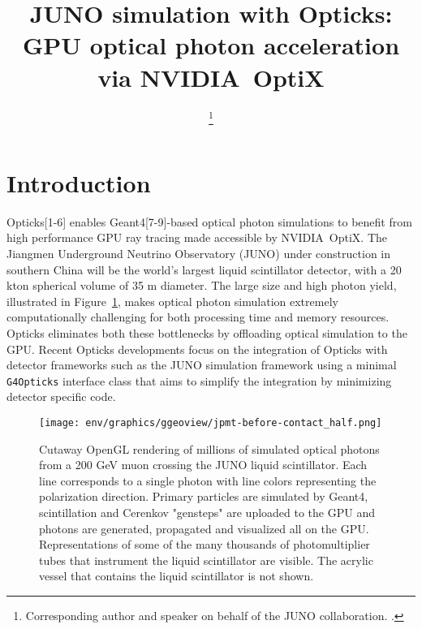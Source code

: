 \documentclass{webofc}
\begin{document}
%
\title{JUNO simulation with Opticks: GPU optical photon acceleration via NVIDIA\textregistered\ OptiX\texttrademark}

\author{ \fnsep\thanks{Corresponding author and speaker on behalf of the JUNO collaboration. .}}



\abstract{%

}
%
\maketitle
%
%
\section{Introduction}%
\label{intro}
%
Opticks[1-6] enables Geant4[7-9]-based optical photon simulations 
to benefit from high performance GPU ray tracing made accessible 
by NVIDIA\textregistered\ OptiX\texttrademark[10-12].
%
The Jiangmen Underground Neutrino Observatory (JUNO)\cite{juno} 
under construction in southern China will be the world's largest liquid scintillator detector, 
with a 20 kton spherical volume of 35 m diameter. The large size and high photon yield, illustrated in Figure~\ref{problem}, 
makes optical photon simulation extremely computationally challenging for both processing time and memory resources. 
Opticks eliminates both these bottlenecks by offloading optical simulation to the GPU. 
%
%
Recent Opticks developments focus on the integration of Opticks with 
detector frameworks such as the JUNO simulation framework using a minimal 
{\tt G4Opticks} interface class that aims to simplify the integration 
by minimizing detector specific code.
%
\begin{figure}
\centering
\texttt{[image: env/graphics/ggeoview/jpmt-before-contact\_half.png]}
\caption{Cutaway OpenGL rendering of millions of simulated optical photons from a 200 GeV muon crossing the JUNO liquid scintillator. 
Each line corresponds to a single photon with line colors representing the polarization direction. Primary particles
are simulated by Geant4, scintillation and Cerenkov "gensteps" are uploaded to the GPU and photons are generated, propagated
and visualized all on the GPU. Representations of some of the many thousands of photomultiplier tubes that instrument the liquid scintillator are visible.
The acrylic vessel that contains the liquid scintillator is not shown.
}
\label{problem}
\end{figure}%
\end{document}
